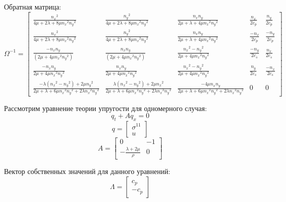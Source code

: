 \documentclass{article}
\begin{document}
Обратная матрица:
\begin{equation}
\Omega^{-1} = \left[\begin{array}{crlcc}
\frac{{n_x}^2}{4\mu + 2\lambda + 8 \mu {n_x}^2 {n_y}^2} & \frac{{n_y}^2}{4\mu + 2\lambda + 8 \mu {n_x}^2 {n_y}^2} & \frac{n_x n_y}{2\mu + \lambda + 4 \mu {n_x}^2 {n_y}^2} & \frac{n_x}{2 c_p} & \frac{n_y}{2 c_p}\\
\frac{{n_x}^2}{4\mu + 2\lambda + 8 \mu {n_x}^2 {n_y}^2} & \frac{{n_y}^2}{4\mu + 2\lambda + 8 \mu {n_x}^2 {n_y}^2} & \frac{n_x n_y}{2\mu + \lambda + 4 \mu {n_x}^2 {n_y}^2}  &  \frac{-n_x}{2 c_p} & \frac{-n_y}{2 c_p}\\
\frac{-n_x n_y}{(2\mu + 4\mu {n_x}^2{n_y}^2)}& \frac{n_x n_y}{(2\mu + 4\mu {n_x}^2{n_y}^2)} & \frac{{n_x}^2-{n_y}^2}{2 \mu + 4\mu {n_x}^2 {n_y}^2} & \frac{-n_y}{2 c_s} & \frac{n_x}{2 c_s} \\
\frac{- n_x n_y}{2\mu + 4\mu {n_x}^2 {n_y}^2}& \frac{n_x n_y}{2\mu + 4\mu {n_x}^2 {n_y}^2} & \frac{{n_x}^2-{n_y}^2}{2 \mu + 4\mu {n_x}^2 {n_y}^2}  &  \frac{n_y}{2 c_s} & \frac{-n_x}{2 c_s} \\
\frac{-\lambda ({n_x}^2 - {n_y}^2) +2 \mu {n_y}^2 }{2 \mu +\lambda + 6 \mu {n_x}^2 {n_y}^2 + 2 \lambda {n_x}^2 {n_y}^2} & \frac{\lambda ({n_x}^2 - {n_y}^2) +2 \mu {n_x}^2 }{2 \mu +\lambda + 6 \mu {n_x}^2 {n_y}^2 + 2 \lambda {n_x}^2 {n_y}^2} & \frac{-4 \mu n_x n_y}{2 \mu +\lambda + 6 \mu {n_x}^2 {n_y}^2 + 2 \lambda {n_x}^2 {n_y}^2} & 0 & 0
\end{array}\right] 
\end{equation}

Рассмотрим уравнение теории упругости для одномерного случая:
\begin{equation}
q_t + A q_x = 0 
\end{equation}
$$ q = \left[\begin{array}{cr}
\sigma^{11} \\
u
\end{array}\right] $$
$$ A = \left[\begin{array}{cr}
0 & -1\\
- \frac{\lambda + 2\mu}{\rho} & 0
\end{array}\right] $$

Вектор собственных значений для данного уравнений:
\begin{equation}
 \Lambda = \left[\begin{array}{cr}
c_p \\
-c_p 
\end{array}\right] 
\end{equation}
\end{document}
